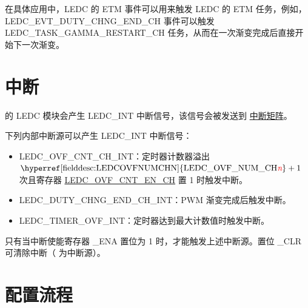 \documentclass[main\_\_CN.tex]{subfiles}
\begin{document}
在具体应用中，LEDC 的 ETM 事件可以用来触发 LEDC 的 ETM 任务，例如，LEDC\_EVT\_DUTY\_CHNG\_END\_CH 事件可以触发LEDC\_TASK\_GAMMA\_RESTART\_CH 任务，从而在一次渐变完成后直接开始下一次渐变。

\section{中断}

\chipname{} 的 LEDC 模块会产生 LEDC\_INT 中断信号，该信号会被发送到 \hyperref[mod:intmtrx]{中断矩阵}。

下列内部中断源可以产生 LEDC\_INT 中断信号：

\begin{itemize}
\item \label{int:ledc-ovf-cnt}LEDC\_OVF\_CNT\_CH\_INT：定时器计数器溢出 $ \textrm{\hyperref[fielddesc:LEDCOVFNUMCHN]{LEDC\_OVF\_NUM\_CH\regindex{n}}} + 1 $ 次且寄存器 \hyperref[fielddesc:LEDCOVFCNTENCHN]{LEDC\_OVF\_CNT\_EN\_CH} 置 1 时触发中断。
\item \label{int:ledc-duty-chng-end}LEDC\_DUTY\_CHNG\_END\_CH\_INT：PWM 渐变完成后触发中断。
\item \label{int:ledc-timer-ovf}LEDC\_TIMER\_OVF\_INT：定时器达到最大计数值时触发中断。
\end{itemize}

只有当中断使能寄存器 \_ENA 置位为 1 时，才能触发上述中断源。置位 \_CLR 可清除中断（ 为中断源）。


\section{配置流程}
\label{sec:ledc-prog-procedures}
\end{document}
